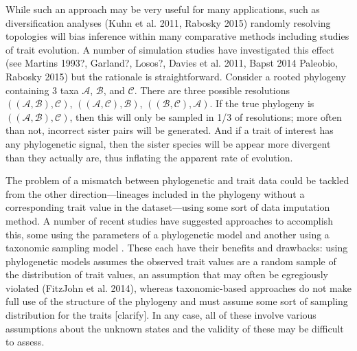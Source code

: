 \documentclass[a4paper,11pt]{article}
\begin{document}
While such an approach may be very useful for many applications, such as diversification analyses (Kuhn et al. 2011, Rabosky 2015) randomly resolving topologies will bias inference within many comparative methods including studies of trait evolution. A number of simulation studies have investigated this effect (see Martins 1993?, Garland?, Losos?, Davies et al. 2011, Bapst 2014 Paleobio, Rabosky 2015) but the rationale is straightforward. Consider a rooted phylogeny containing 3 taxa $\mathcal{A}$, $\mathcal{B}$, and $\mathcal{C}$. There are three possible resolutions $((\mathcal{A},\mathcal{B}),\mathcal{C})$, $((\mathcal{A},\mathcal{C}),\mathcal{B})$, $((\mathcal{B},\mathcal{C}),\mathcal{A})$. If the true phylogeny is $((\mathcal{A},\mathcal{B}),\mathcal{C})$, then this will only be sampled in 1/3 of resolutions; more often than not, incorrect sister pairs will be generated. And if a trait of interest has any phylogenetic signal, then the sister species will be appear more divergent than they actually are, thus inflating the apparent rate of evolution.

The problem of a mismatch between phylogenetic and trait data could be tackled from the other direction---lineages included in the phylogeny without a corresponding trait value in the dataset---using some sort of data imputation method. A number of recent studies have suggested approaches to accomplish this, some using the parameters of a phylogenetic model \citep{Fagan2013, Swenson2014, PEM} and another using a taxonomic sampling model \citep{FitzJohn2014}. These each have their benefits and drawbacks: using phylogenetic models assumes the observed trait values are a random sample of the distribution of trait values, an assumption that may often be egregiously violated (FitzJohn et al. 2014), whereas taxonomic-based approaches do not make full use of the structure of the phylogeny and must assume some sort of sampling distribution for the traits [clarify]. In any case, all of these involve various assumptions about the unknown states and the validity of these may be difficult to assess.


\end{document}
